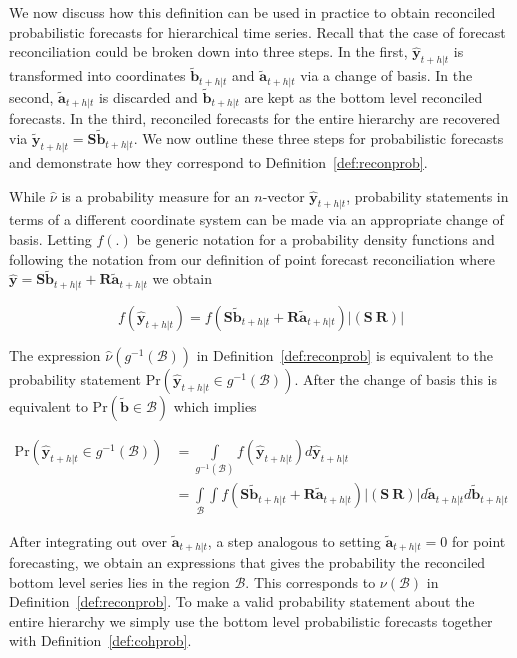 \documentclass[a4paper, 11pt]{article}
\theoremstyle{theo}
\theoremstyle{definition}
\begin{document}
We now discuss how this definition can be used in practice to obtain reconciled probabilistic forecasts for hierarchical time series.   Recall that the case of forecast reconciliation could be broken down into three steps.  In the first, $\hat{\bm{y}}_{t+h|t}$ is transformed into coordinates $\tilde{\bm{b}}_{t+h|t}$ and $\tilde{\bm{a}}_{t+h|t}$ via a change of basis.  In the second, $\tilde{\bm{a}}_{t+h|t}$ is discarded and $\tilde{\bm{b}}_{t+h|t}$ are kept as the bottom level reconciled forecasts.  In the third, reconciled forecasts for the entire hierarchy are recovered via $\tilde{\bm{y}}_{t+h|t}=\bm{S}\tilde{\bm{b}}_{t+h|t}$.  We now outline these three steps for probabilistic forecasts and demonstrate how they correspond to Definition~\ref{def:reconprob}.

While $\hat{\nu}$ is a probability measure for an $n$-vector $\hat{\bm{y}}_{t+h|t}$,  probability statements in terms of a different coordinate system can be made via an appropriate change of basis. Letting $f(.)$ be generic notation for a probability density functions and following the notation from our definition of point forecast reconciliation where $\hat{\bm{y}}=\bm{S}\tilde{\bm{b}}_{t+h|t}+\bm{R}\tilde{\bm{a}}_{t+h|t}$ we obtain

\begin{equation}
f(\hat{\bm{y}}_{t+h|t})=f(\bm{S}\tilde{\bm{b}}_{t+h|t}+\bm{R}\tilde{\bm{a}}_{t+h|t})|\left(\bm{S}~\bm{R}\right)|
\end{equation}

The expression $\hat{\nu}(g^{-1}(\mathcal{B}))$ in Definition~\ref{def:reconprob} is equivalent to the probability statement $\mbox{Pr}(\hat{\bm{y}}_{t+h|t}\in g^{-1}(\mathcal{B}))$.  After the change of basis this is equivalent to $\mbox{Pr}(\tilde{\bm{b}}\in \mathcal{B})$ which implies

\begin{align}
\mbox{Pr}(\hat{\bm{y}}_{t+h|t}\in g^{-1}(\mathcal{B}))&=\int\limits_{g^{-1}(\mathcal{B})}f(\hat{\bm{y}}_{t+h|t})d\hat{\bm{y}}_{t+h|t}\\
&=\int\limits_{\mathcal{B}}\int f(\bm{S}\tilde{\bm{b}}_{t+h|t}+\bm{R}\tilde{\bm{a}}_{t+h|t})|\left(\bm{S}~\bm{R}\right)|d\tilde{\bm{a}}_{t+h|t}d\tilde{\bm{b}}_{t+h|t}
\end{align}

After integrating out over $\tilde{\bm{a}}_{t+h|t}$, a step analogous to setting $\tilde{\bm{a}}_{t+h|t}=0$ for point forecasting, we obtain an expressions that gives the probability the reconciled bottom level series lies in the region $\mathcal{B}$. This corresponds to $\nu(\mathcal{B})$ in Definition~\ref{def:reconprob}.  To make a valid probability statement about the entire hierarchy we simply use the bottom level probabilistic forecasts together with Definition~\ref{def:cohprob}. 
\end{document}
